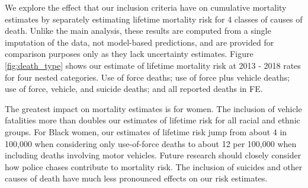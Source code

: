 \documentclass{article}
\begin{document}
We explore the effect that our inclusion criteria have on cumulative mortality estimates by separately estimating lifetime mortality risk for 4 classes of causes of death. Unlike the main analysis, these results are computed from a single imputation of the data, not model-based predictions, and are provided for comparison purposes only as they lack uncertainty estimates. Figure \ref{fig:death_type} shows our estimate of lifetime mortality risk at 2013 - 2018 rates for four nested categories. Use of force deaths; use of force plus vehicle deaths; use of force, vehicle, and suicide deaths; and all reported deaths in FE. 

The greatest impact on mortality estimates is for women. The inclusion of vehicle fatalities more than doubles our estimates of lifetime risk for all racial and ethnic groups. For Black women, our estimates of lifetime risk jump from about 4 in 100,000 when considering only use-of-force deaths to about 12 per 100,000 when including deaths involving motor vehicles. Future research should closely consider how police chases contribute to mortality risk. The inclusion of suicides and other causes of death have much less pronounced effects on our risk estimates.


\end{document}
